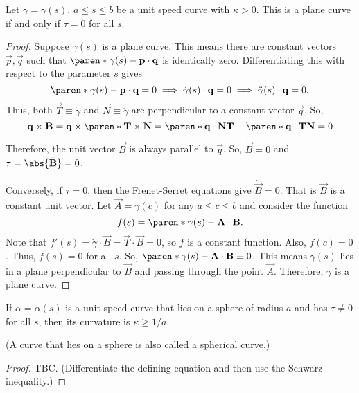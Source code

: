 \documentclass[11pt]{penrose}
\newcommand{\vT}{\vec{T}}
\newcommand{\vN}{\vec{N}}
\newcommand{\vB}{\vec{B}}
\begin{document}
\begin{nthm}
    Let $\gamma = \gamma(s)$, $a \leq s \leq b$ be a unit speed curve with $\kappa > 0$. This is a plane curve if and only if $\tau = 0$ for all $s$.
\end{nthm}
\begin{proof}
    Suppose $\gamma(s)$ is a plane curve. This means there are constant vectors $\vec{p}, \vec{q}$ such that $\paren*{\gamma(s) - \vec{p}} \cdot \vec{q}$ is identically zero. Differentiating this with respect to the parameter $s$ gives
    \begin{equation}
        \paren*{\gamma(s) - \vec{p}} \cdot \vec{q} = 0
        \implies
        \dot{\gamma}(s) \cdot \vec{q} = 0
        \implies
        \ddot{\gamma}(s) \cdot \vec{q} = 0.
    \end{equation}
    Thus, both $\vT \equiv \dot{\gamma}$ and $\vN \equiv \ddot{\gamma}$ are perpendicular to a constant vector $\vec{q}$. So,
    \begin{equation}
         \vec{q} \times \vB
        = \vec{q} \times \paren*{\vT \times \vN}
        = \paren*{\vec{q} \cdot \vN} \vT - \paren*{\vec{q} \cdot \vT} \vN
        = 0
    \end{equation}
    Therefore, the unit vector $\vB$ is always parallel to $\vec{q}$. So, $\dot{\vB} = 0$ and $\tau = \abs{\dot{\vB}} = 0$.

    Conversely, if $\tau = 0$, then the Frenet-Serret equations give $\dot{\vB} = 0$. That is $\vB$ is a constant unit vector. Let $\vec{A} = \gamma(c)$ for any $a \leq c \leq b$ and consider the function
    \begin{equation}
        f(s) = \paren*{\gamma(s) - \vec{A}} \cdot \vB.
    \end{equation}
    Note that $f'(s) = \dot{\gamma} \cdot \vB = \vT \cdot \vB = 0$, so $f$ is a constant function. Also, $f(c) = 0$. Thus, $f(s) = 0$ for all $s$. So, $\paren*{\gamma(s) - \vec{A}} \cdot \vB \equiv 0$. This means $\gamma(s)$ lies in a plane perpendicular to $\vB$ and passing through the point $\vec{A}$. Therefore, $\gamma$ is a plane curve.
\end{proof}

\begin{nthm}
    If $\alpha = \alpha(s)$ is a unit speed curve that lies on a sphere of radius $a$ and has $\tau \neq 0$ for all $s$, then its curvature is $\kappa \geq 1/a$.

    (A curve that lies on a sphere is also called a spherical curve.)
\end{nthm}
\begin{proof}
    TBC. (Differentiate the defining equation and then use the Schwarz inequality.)
\end{proof}
\end{document}
